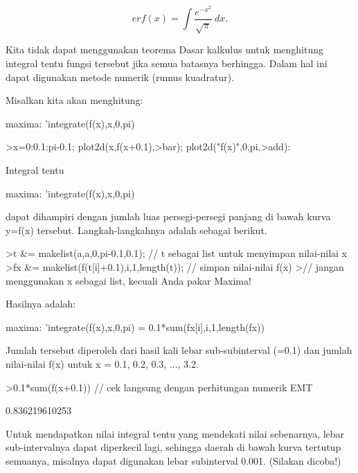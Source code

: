\documentclass[a4paper,10pt]{article}
\begin{document}
\begin{eulernotebook}
\begin{eulercomment}
\begin{eulercomment}
\begin{eulercomment}
\begin{eulercomment}
\begin{eulercomment}
\begin{eulercomment}
\begin{eulercomment}
\begin{eulercomment}
\begin{eulercomment}
\begin{eulercomment}
\begin{eulercomment}
\begin{eulercomment}
\begin{eulercomment}
\begin{eulercomment}
\begin{eulercomment}
\begin{eulercomment}
\begin{eulercomment}
\end{eulercomment}
\begin{eulerformula}
\[
erf(x) = \int \frac{e^{-x^2}}{\sqrt{\pi}} \ dx.
\]
\end{eulerformula}
\begin{eulercomment}
Kita tidak dapat menggunakan teorema Dasar kalkulus untuk menghitung integral tentu fungsi tersebut jika semua batasnya berhingga.
Dalam hal ini dapat digunakan metode numerik (rumus kuadratur).

Misalkan kita akan menghitung:

maxima: 'integrate(f(x),x,0,pi)
\end{eulercomment}
\begin{eulerprompt}
>x=0:0.1:pi-0.1; plot2d(x,f(x+0.1),>bar); plot2d("f(x)",0,pi,>add):
\end{eulerprompt}
\begin{eulercomment}
Integral tentu

maxima: 'integrate(f(x),x,0,pi)

dapat dihampiri dengan jumlah luas persegi-persegi panjang di bawah kurva y=f(x)
tersebut. Langkah-langkahnya adalah sebagai berikut.
\end{eulercomment}
\begin{eulerprompt}
>t &= makelist(a,a,0,pi-0.1,0.1); // t sebagai list untuk menyimpan nilai-nilai x
>fx &= makelist(f(t[i]+0.1),i,1,length(t)); // simpan nilai-nilai f(x)
>// jangan menggunakan x sebagai list, kecuali Anda pakar Maxima!
\end{eulerprompt}
\begin{eulercomment}
Hasilnya adalah:

maxima: 'integrate(f(x),x,0,pi) = 0.1*sum(fx[i],i,1,length(fx))

Jumlah tersebut diperoleh dari hasil kali lebar sub-subinterval (=0.1) dan jumlah nilai-nilai f(x) untuk
x = 0.1, 0.2, 0.3, ..., 3.2.
\end{eulercomment}
\begin{eulerprompt}
>0.1*sum(f(x+0.1)) // cek langsung dengan perhitungan numerik EMT
\end{eulerprompt}
\begin{euleroutput}
  0.836219610253
\end{euleroutput}
\begin{eulercomment}
Untuk mendapatkan nilai integral tentu yang mendekati nilai sebenarnya, lebar
sub-intervalnya dapat diperkecil lagi, sehingga daerah di bawah kurva tertutup
semuanya, misalnya dapat digunakan lebar subinterval 0.001. (Silakan dicoba!)


\end{eulercomment}
\end{eulercomment}
\end{eulercomment}
\end{eulercomment}
\end{eulercomment}
\end{eulercomment}
\end{eulercomment}
\end{eulercomment}
\end{eulercomment}
\end{eulercomment}
\end{eulercomment}
\end{eulercomment}
\end{eulercomment}
\end{eulercomment}
\end{eulercomment}
\end{eulercomment}
\end{eulercomment}
\end{eulernotebook}
\end{document}
